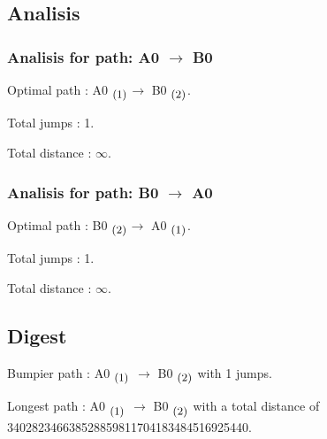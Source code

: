 \documentclass{article}
\newcommand{\subscript}[1]{\ensuremath{_{\textrm{\small#1}}}}
\begin{document}
\clearpage

\subsection{Analisis}
\subsubsection{Analisis for path: A0 $\longrightarrow$ B0}
\begin{compactitem}
\item Optimal path : {\Large A0 \subscript{(1)}}$\longrightarrow$ B0 \subscript{(2)}.
\item Total jumps : {\Large 1}.
\item Total distance : {\Large $\infty$}.
\end{compactitem}

\subsubsection{Analisis for path: B0 $\longrightarrow$ A0}
\begin{compactitem}
\item Optimal path : {\Large B0 \subscript{(2)}}$\longrightarrow$ A0 \subscript{(1)}.
\item Total jumps : {\Large 1}.
\item Total distance : {\Large $\infty$}.
\end{compactitem}

\subsection{Digest}
\begin{compactitem}
\item Bumpier path : {\Large A0 \subscript{(1)} $\longrightarrow$ B0 \subscript{(2)}} with 1 jumps.
\item Longest path : {\Large A0 \subscript{(1)} $\longrightarrow$ B0 \subscript{(2)}} with a total distance of {\Large 340282346638528859811704183484516925440}.
\end{compactitem}
\end{document}
